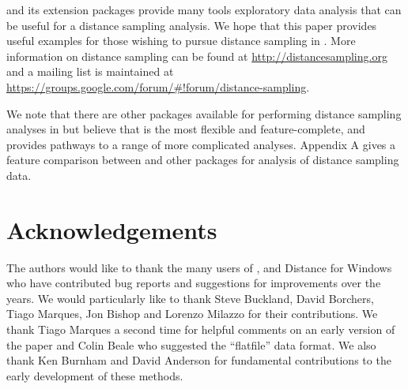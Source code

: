 \documentclass[article,shortnames]{jss}
\begin{document}
 and its extension packages provide many tools exploratory
data analysis that can be useful for a distance sampling analysis. We
hope that this paper provides useful examples for those wishing to
pursue distance sampling in . More information on distance
sampling can be found at \url{http://distancesampling.org} and a mailing
list is maintained at
\url{https://groups.google.com/forum/#!forum/distance-sampling}.

We note that there are other packages available for performing distance
sampling analyses in  but believe that  is the
most flexible and feature-complete, and provides pathways to a range of
more complicated analyses. Appendix A gives a feature comparison between
 and other  packages for analysis of distance
sampling data.

\section{Acknowledgements}\label{acknowledgements}

The authors would like to thank the many users of ,
 and Distance for Windows who have contributed bug reports and
suggestions for improvements over the years. We would particularly like
to thank Steve Buckland, David Borchers, Tiago Marques, Jon Bishop and
Lorenzo Milazzo for their contributions. We thank Tiago Marques a second
time for helpful comments on an early version of the paper and Colin
Beale who suggested the ``flatfile'' data format. We also thank Ken
Burnham and David Anderson for fundamental contributions to the early
development of these methods.

\renewcommand\refname{Bibliography}

\end{document}
